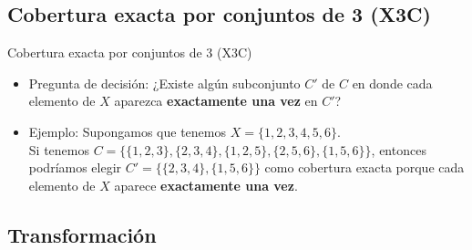 \renewcommand{\subsectiontitle}{Cobertura exacta por conjuntos de 3 (X3C)}
\subsection{\subsectiontitle}

\begin{frame}{\subsectiontitle}
    \begin{itemize}
        \itemj Ejemplar genérico: Un conjunto $X$ con $|X|=3q$ y una colección $C$ de subconjuntos de 3 elementos de $X$.
        \item Pregunta de decisión: ¿Existe algún subconjunto $C'$ de $C$ en donde cada elemento de $X$ aparezca \textbf{exactamente una vez} en $C'$? 
        \item Ejemplo: Supongamos que tenemos $X=\{1,2,3,4,5,6\}$.\\
        Si tenemos $C=\{\{1,2,3\},\{2,3,4\},\{1,2,5\},\{2,5,6\},\{1,5,6\}\}$, entonces podríamos elegir $C'=\{\{2,3,4\},\{1,5,6\}\}$ como cobertura exacta porque cada elemento de $X$ aparece \textbf{exactamente una vez}.
    \end{itemize}
\end{frame}

\renewcommand{\subsectiontitle}{Transformación}
\subsection{\subsectiontitle}


